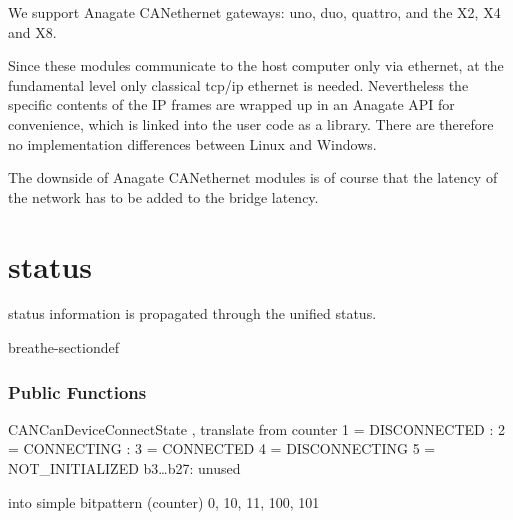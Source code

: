 \documentclass[a4paper,10pt,english]{sphinxmanual}
\begin{document}
\sphinxAtStartPar
We support Anagate CAN\sphinxhyphen{}ethernet gateways: uno, duo, quattro, and the X2, X4 and X8.

\sphinxAtStartPar
Since these modules communicate to the host computer only via ethernet, at the fundamental level only classical
tcp/ip ethernet is needed. Nevertheless the specific contents of the IP frames are wrapped up in an Anagate API for convenience, which is linked
into the user code as a library. There are therefore no implementation differences between Linux and Windows.

\sphinxAtStartPar
The downside of Anagate CAN\sphinxhyphen{}ethernet modules is of course that the latency of the network has to be added to the bridge latency.


\section{status}
\label{\detokenize{vendors/anagate:status}}
\sphinxAtStartPar
status information is propagated through the unified status.

\begin{fulllineitems}
\label{\detokenize{vendors/anagate:_CPPv410AnaCanScan}}%
\pysigstartmultiline
{}%
\pysigstopmultiline
\begin{sphinxuseclass}{breathe-sectiondef}\subsubsection*{Public Functions}

\begin{fulllineitems}
\label{\detokenize{vendors/anagate:_CPPv4N10AnaCanScan13getPortStatusEv}}%
\pysigstartmultiline
{}%
\pysigstopmultiline
\sphinxAtStartPar
CANCanDeviceConnectState , translate from counter 1 = DISCONNECTED : 2 = CONNECTING : 3 = CONNECTED 4 = DISCONNECTING 5 = NOT\_INITIALIZED b3…b27: unused

\sphinxAtStartPar
into simple bitpattern (counter) 0, 10, 11, 100, 101 

\end{fulllineitems}


\end{sphinxuseclass}
\end{fulllineitems}
\end{document}
